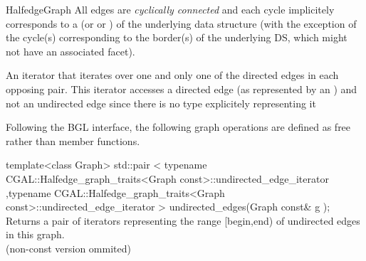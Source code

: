 \begin{ccRefConcept}{HalfedgeGraph}
All edges are {\em cyclically connected} and each cycle implicitely corresponds to a  (or  or ) of the underlying data structure (with the exception of the cycle(s) corresponding to the border(s) of the underlying DS, which might not have an associated facet).


\ccRefines
{}

\ccTypes
  {An iterator that iterates over one and only one of the directed edges
  in each opposing pair. This iterator accesses a directed edge 
  (as represented by an ) and not an undirected edge 
  since there is no type explicitely representing it}{}
  
\ccOperations

Following the BGL interface, the following graph operations are defined as free rather than member functions.

  \ccFunction
  {template<class Graph>
  std::pair < typename CGAL::Halfedge_graph_traits<Graph const>::undirected_edge_iterator
             ,typename CGAL::Halfedge_graph_traits<Graph const>::undirected_edge_iterator
             >   
  undirected_edges(Graph const& g );
  }
  {Returns a pair of iterators representing the range [begin,end) 
  of undirected edges in this graph.\\
  (non-const version ommited)
  }

\ccHasModels
{}\\
\\

\end{ccRefConcept}

